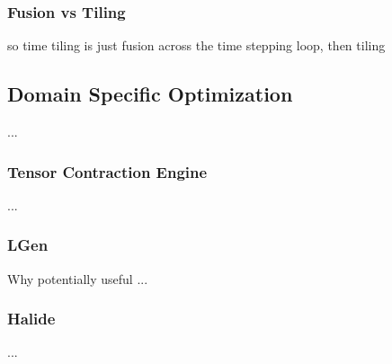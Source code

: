  \subsubsection{Fusion vs Tiling}
 \label{sec:bkg:sparsetiling}
 so time tiling is just fusion across the time stepping loop, then tiling



\subsection{Domain Specific Optimization}
...

\subsubsection{Tensor Contraction Engine}
...

\subsubsection{LGen}
Why potentially useful ...

\subsubsection{Halide}
...

